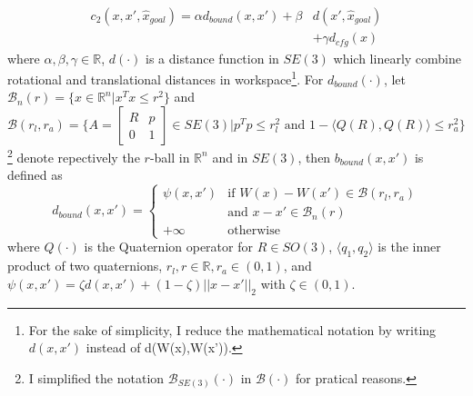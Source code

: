 \begin{equation}\label{eq:cost2}
\begin{aligned}
c_2(x,x',\hat{x}_{goal})=\alpha d_{bound}(x,x') +\beta &d(x',\hat{x}_{goal})\\
&+\gamma d_{cfg}(x)
\end{aligned}
\end{equation} 
where $\alpha,\beta,\gamma\in\mathbb{R}$, $d(\cdot)$ is a distance function in $SE(3)$ which linearly combine rotational and translational distances in workspace\footnote{For the sake of simplicity, I reduce the mathematical notation by writing $d(x,x')$ instead of d(W(x),W(x')).}. For $d_{bound}(\cdot)$, let $\mathcal{B}_n(r)=\{x\in\mathbb{R}^n|x^Tx\leq r^2\}$ and $\mathcal{B}(r_{l},r_{a})=\{A=[\begin{smallmatrix}R&p\\ 0&1\end{smallmatrix}]\in SE(3)|p^Tp\leq r_{l}^2\text{ and } 1-\langle Q(R),Q(R)\rangle\leq r_{a}^2\}$\footnote{I simplified the notation $\mathcal{B}_{SE(3)}(\cdot)$ in $\mathcal{B}(\cdot)$ for pratical reasons.} denote repectively the $r$-ball in $\mathbb{R}^n$ and in $SE(3)$, then $b_{bound}(x,x')$ is defined as %
$$
d_{bound}(x,x')=
\begin{cases}
\psi(x,x')& \text{if }W(x)-W(x')\in\mathcal{B}(r_{l},r_{a}) \\
& \text{and }x-x'\in\mathcal{B}_n(r) \\
+\infty & \text{otherwise}
\end{cases}
$$
where $Q(\cdot)$ is the Quaternion operator for $R\in SO(3)$, $\langle q_1,q_2\rangle$ is the inner product of two quaternions, $r_{l}, r\in\mathbb{R}, r_{a}\in (0,1)$, and $\psi(x,x')=\zeta d(x,x')+(1-\zeta)||x-x'||_2$ with $\zeta\in(0,1)$.
